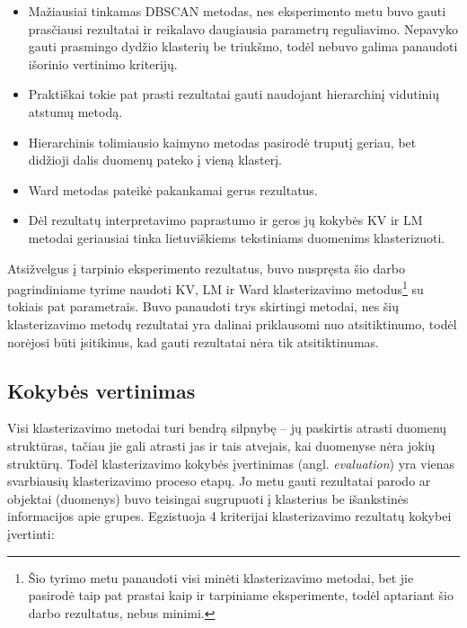 \documentclass{VUMIFInfBakalaurinis}
\begin{document}
\begin{itemize}
\item
  Mažiausiai tinkamas DBSCAN metodas, nes eksperimento metu buvo gauti
  prasčiausi rezultatai ir reikalavo daugiausia parametrų reguliavimo.
  Nepavyko gauti prasmingo dydžio klasterių be triukšmo, todėl nebuvo
  galima panaudoti išorinio vertinimo kriterijų.
\item
  Praktiškai tokie pat prasti rezultatai gauti naudojant hierarchinį
  vidutinių atstumų metodą.
\item
  Hierarchinis tolimiausio kaimyno metodas pasirodė truputį geriau, bet
  didžioji dalis duomenų pateko į vieną klasterį.
\item
  Ward metodas pateikė pakankamai gerus rezultatus.
\item
  Dėl rezultatų interpretavimo paprastumo ir geros jų kokybės KV ir LM metodai geriausiai tinka lietuviškiems
  tekstiniams duomenims klasterizuoti.
\end{itemize}

Atsižvelgus į tarpinio eksperimento rezultatus, buvo nuspręsta šio darbo
pagrindiniame tyrime naudoti KV, LM ir Ward klasterizavimo
metodus\footnote{Šio tyrimo metu panaudoti visi minėti klasterizavimo
  metodai, bet jie pasirodė taip pat prastai kaip ir tarpiniame
  eksperimente, todėl aptariant šio darbo rezultatus, nebus minimi.} su
tokiais pat parametrais. Buvo panaudoti trys skirtingi metodai, nes šių
klasterizavimo metodų rezultatai yra dalinai priklausomi nuo
atsitiktinumo, todėl norėjosi būti įsitikinus, kad gauti rezultatai nėra
tik atsitiktinumas.

\subsection{Kokybės vertinimas}\label{eval}

Visi klasterizavimo metodai turi bendrą silpnybę -- jų paskirtis atrasti
duomenų struktūras, tačiau jie gali atrasti jas ir tais atvejais, kai
duomenyse nėra jokių struktūrų. Todėl klasterizavimo kokybės įvertinimas
(angl. \emph{evaluation}) yra vienas svarbiausių klasterizavimo proceso
etapų. Jo metu gauti rezultatai parodo ar objektai (duomenys) buvo
teisingai sugrupuoti į klasterius be išankstinės informacijos apie
grupes. Egzistuoja 4 kriterijai klasterizavimo rezultatų kokybei
įvertinti:
\end{document}
